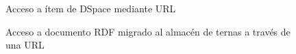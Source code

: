 \begin{figure}[!ht]
	\centering
    \caption{Acceso a ítem de DSpace mediante URL}
    \label{acceso-item-dspace}
\end{figure}

\begin{figure}[!ht]
	\centering
    \caption{Acceso a documento RDF migrado al almacén de ternas a través de una URL}
    \label{acceso-rdf-dspace}
\end{figure}